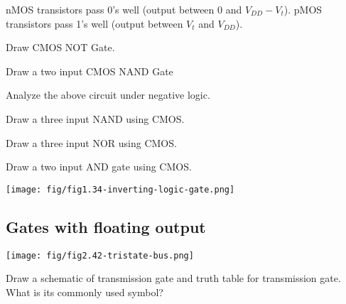 \begin{remark}
  nMOS transistors pass 0's well (output between 0 and $V_{DD} - V_t$). pMOS
  transistors pass 1's well (output between $V_t$ and $V_{DD}$).
\end{remark}
\begin{example}
Draw CMOS NOT Gate.
\end{example}
\vspace{10em}

\begin{example}
Draw a two input CMOS NAND Gate
\end{example}
\vspace{10em}


\begin{definition}
\end{definition}
\vspace{5em}

\begin{example}
  Analyze the above circuit under negative logic.
\end{example}
\vspace{10em}



\begin{example}
Draw a three input NAND using CMOS.
\end{example}
\vspace{10em}


\begin{example}
Draw a three input NOR using CMOS.
\end{example}
\vspace{10em}

\begin{example}
  Draw a two input AND gate using CMOS.
\end{example}
\vspace{10em}

\texttt{[image: fig/fig1.34-inverting-logic-gate.png]}

\subsection{Gates with floating output}
\texttt{[image: fig/fig2.42-tristate-bus.png]}

\begin{definition}
  Draw a schematic of transmission gate and truth table for transmission gate.
  What is its commonly used symbol?
\end{definition}
\vspace{10em}


